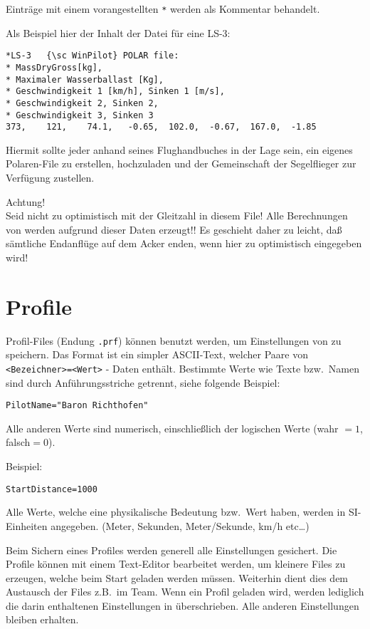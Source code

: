 Einträge mit einem vorangestellten \verb|*| werden als Kommentar behandelt.

Als Beispiel hier der Inhalt der Datei für eine LS-3:
\begin{verbatim}
*LS-3	{\sc WinPilot} POLAR file:
* MassDryGross[kg],
* Maximaler Wasserballast [Kg],
* Geschwindigkeit 1 [km/h], Sinken 1 [m/s],
* Geschwindigkeit 2, Sinken 2,
* Geschwindigkeit 3, Sinken 3  	
373,	121,	74.1,	-0.65,	102.0,	-0.67,	167.0,	-1.85
\end{verbatim}

Hiermit sollte jeder anhand seines Flughandbuches in der Lage sein, ein eigenes Polaren-File zu
erstellen, hochzuladen  und der Gemeinschaft der Segelflieger zur Verfügung zustellen.

Achtung!\\
Seid nicht zu optimistisch mit der Gleitzahl in diesem File!
\tip Alle Berechnungen von  \xc werden aufgrund dieser Daten erzeugt!!  Es geschieht daher zu
leicht, daß sämtliche Endanflüge auf dem Acker enden, wenn hier zu optimistisch
eingegeben wird!


\section{Profile}
Profil-Files (Endung \verb|.prf|) können benutzt werden, um Einstellungen von \xc zu speichern.
Das Format ist ein simpler ASCII-Text, welcher Paare von  \verb|<Bezeichner>=<Wert>|  - Daten enthält.
Bestimmte Werte wie Texte bzw.\ Namen sind durch Anführungsstriche getrennt, siehe folgende Beispiel:

\begin{verbatim}
PilotName="Baron Richthofen"
\end{verbatim}

Alle anderen Werte sind numerisch, einschließlich der logischen Werte (wahr $=1$, falsch$=0$).

Beispiel:


\begin{verbatim}
StartDistance=1000
\end{verbatim}

Alle Werte, welche eine physikalische Bedeutung bzw.\ Wert haben, werden in \textsf{SI}-Einheiten angegeben.
(Meter, Sekunden, Meter/Sekunde, km/h etc\dots)

Beim Sichern eines Profiles werden generell alle Einstellungen gesichert.
Die Profile können mit einem Text-Editor bearbeitet werden, um kleinere Files zu erzeugen,
welche beim Start geladen werden müssen. Weiterhin dient dies dem Austausch der Files
z.B.\ im Team. Wenn ein Profil geladen wird, werden lediglich die darin enthaltenen
Einstellungen in \xc überschrieben. Alle anderen Einstellungen bleiben erhalten.

